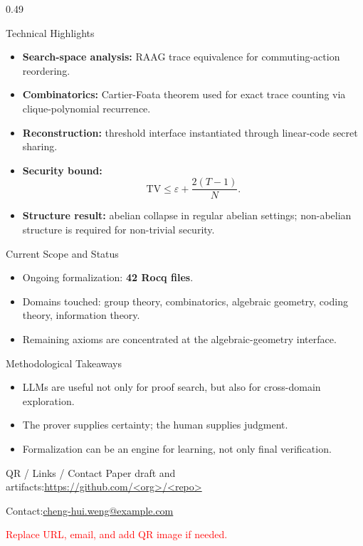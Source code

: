 \documentclass[final,t]{beamer}
\newcommand{\kw}[1]{\textbf{#1}}
\newcommand{\todo}[1]{\textcolor{red}{#1}}
\begin{document}
\begin{frame}[t]
\begin{columns}[t,totalwidth=\linewidth]
  \begin{column}{0.49\linewidth}
    \begin{block}{Technical Highlights}
      \begin{itemize}
        \item \kw{Search-space analysis:} RAAG trace equivalence for commuting-action reordering.
        \item \kw{Combinatorics:} Cartier-Foata theorem used for exact trace counting via clique-polynomial recurrence.
        \item \kw{Reconstruction:} threshold interface instantiated through linear-code secret sharing.
        \item \kw{Security bound:}
          \[
          \mathrm{TV} \le \varepsilon + \frac{2(T-1)}{N}.
          \]
        \item \kw{Structure result:} abelian collapse in regular abelian settings; non-abelian structure is required for non-trivial security.
      \end{itemize}
    \end{block}

    \begin{block}{Current Scope and Status}
      \begin{itemize}
        \item Ongoing formalization: \kw{42 Rocq files}.
        \item Domains touched: group theory, combinatorics, algebraic geometry, coding theory, information theory.
        \item Remaining axioms are concentrated at the algebraic-geometry interface.
      \end{itemize}
    \end{block}

    \begin{block}{Methodological Takeaways}
      \begin{itemize}
        \item LLMs are useful not only for proof search, but also for cross-domain exploration.
        \item The prover supplies certainty; the human supplies judgment.
        \item Formalization can be an engine for learning, not only final verification.
      \end{itemize}
    \end{block}

    \begin{block}{QR / Links / Contact}
      \small
      Paper draft and artifacts:\quad \url{https://github.com/<org>/<repo>}

      \vspace{0.25em}
      Contact:\quad \href{mailto:cheng-hui.weng@example.com}{cheng-hui.weng@example.com}

      \vspace{0.4em}
      \todo{Replace URL, email, and add QR image if needed.}
    \end{block}
  \end{column}
\end{columns}
\end{frame}
\end{document}
